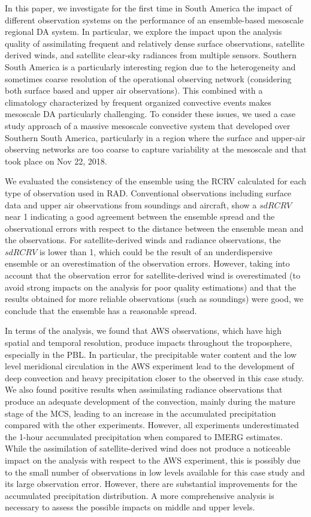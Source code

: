 \documentclass[authoryear,preprint,review,12pt]{elsarticle} %
\begin{document}
In this paper, we investigate for the first time in South America the impact of different observation systems on the performance of an ensemble-based mesoscale regional DA system. In particular, we explore the impact upon the analysis quality of assimilating frequent and relatively dense surface observations, satellite derived winds, and satellite clear-sky radiances from multiple sensors. Southern South America is a particularly interesting region due to the heterogeneity and sometimes coarse resolution of the operational observing network (considering both surface based and upper air observations). This combined with a climatology characterized by frequent organized convective events makes mesoscale DA particularly challenging. To consider these issues, we used a case study approach of a massive mesoscale convective system that developed over Southern South America, particularly in a region where the surface and upper-air observing networks are too coarse to capture variability at the mesoscale and that took place on Nov 22, 2018.

We evaluated the consistency of the ensemble using the RCRV calculated for each type of observation used in RAD. Conventional observations including surface data and upper air observations from soundings and aircraft, show a \(sd RCRV\) near 1 indicating a good agreement between the ensemble spread and the observational errors with respect to the distance between the ensemble mean and the observations. For satellite-derived winds and radiance observations, the \(sd RCRV\) is lower than 1, which could be the result of an underdispersive ensemble or an overestimation of the observation errors. However, taking into account that the observation error for satellite-derived wind is overestimated (to avoid strong impacts on the analysis for poor quality estimations) and that the results obtained for more reliable observations (such as soundings) were good, we conclude that the ensemble has a reasonable spread.

In terms of the analysis, we found that AWS observations, which have high spatial and temporal resolution, produce impacts throughout the troposphere, especially in the PBL. In particular, the precipitable water content and the low level meridional circulation in the AWS experiment lead to the development of deep convection and heavy precipitation closer to the observed in this case study. We also found positive results when assimilating radiance observations that produce an adequate development of the convection, mainly during the mature stage of the MCS, leading to an increase in the accumulated precipitation compared with the other experiments. However, all experiments underestimated the 1-hour accumulated precipitation when compared to IMERG estimates. While the assimilation of satellite-derived wind does not produce a noticeable impact on the analysis with respect to the AWS experiment, this is possibly due to the small number of observations in low levels available for this case study and its large observation error. However, there are substantial improvements for the accumulated precipitation distribution. A more comprehensive analysis is necessary to assess the possible impacts on middle and upper levels.
\end{document}
